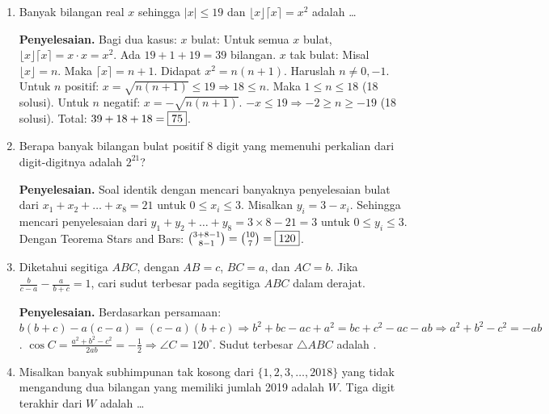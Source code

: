 \documentclass[12pt]{scrartcl}
\begin{document}
\begin{enumerate}
    \textbf{Penyelesaian.} Misalkan $A = \sum_{k=1}^{99} \sqrt{10+\sqrt{k}}$ dan $B = \sum_{k=1}^{99} \sqrt{10-\sqrt{k}}$. Tinjau $\frac{A}{B} = 1 + \frac{A-B}{B}$.
    $A-B = \sum_{k=1}^{99} \left(\sqrt{10+\sqrt{k}} - \sqrt{10-\sqrt{k}}\right) = \sum_{k=1}^{99} \sqrt{20-2\sqrt{100-k}} = \sqrt{2} \sum_{k=1}^{99} \sqrt{10-\sqrt{k}} = \sqrt{2}B$.
    Sehingga $\frac{A}{B} = 1+\sqrt{2}$. Jadi, soal $= \left(\frac{A}{B}\right)^2 + \left(\frac{B}{A}\right)^2 = (1+\sqrt{2})^2 + (\sqrt{2}-1)^2 = 3+2\sqrt{2}+3-2\sqrt{2} = \fbox{6}$.
    
    \item Banyak bilangan real $x$ sehingga $|x| \le 19$ dan $\lfloor x \rfloor \lceil x \rceil = x^2$ adalah \dots
    
    \textbf{Penyelesaian.} Bagi dua kasus:
    $x$ bulat: Untuk semua $x$ bulat, $\lfloor x \rfloor \lceil x \rceil = x \cdot x = x^2$. Ada $19+1+19=39$ bilangan.
    $x$ tak bulat: Misal $\lfloor x \rfloor = n$. Maka $\lceil x \rceil = n+1$. Didapat $x^2=n(n+1)$. Haruslah $n \ne 0, -1$.
    Untuk $n$ positif: $x = \sqrt{n(n+1)} \le 19 \Rightarrow 18 \le n$. Maka $1 \le n \le 18$ (18 solusi).
    Untuk $n$ negatif: $x = -\sqrt{n(n+1)}$. $-x \le 19 \Rightarrow -2 \ge n \ge -19$ (18 solusi).
    Total: $39+18+18 = \fbox{75}$.
    
    \item Berapa banyak bilangan bulat positif 8 digit yang memenuhi perkalian dari digit-digitnya adalah $2^{21}$?
    
    \textbf{Penyelesaian.} Soal identik dengan mencari banyaknya penyelesaian bulat dari $x_1+x_2+\dots+x_8=21$ untuk $0 \le x_i \le 3$. Misalkan $y_i=3-x_i$. Sehingga mencari penyelesaian dari $y_1+y_2+\dots+y_8 = 3 \times 8 - 21 = 3$ untuk $0 \le y_i \le 3$.
    Dengan Teorema Stars and Bars: $\binom{3+8-1}{8-1} = \binom{10}{7} = \fbox{120}$.
    
    \item Diketahui segitiga $ABC$, dengan $AB=c$, $BC=a$, dan $AC=b$. Jika $\frac{b}{c-a}-\frac{a}{b+c}=1$, cari sudut terbesar pada segitiga $ABC$ dalam derajat.
    
    \textbf{Penyelesaian.} Berdasarkan persamaan: $b(b+c)-a(c-a) = (c-a)(b+c) \Rightarrow b^2+bc-ac+a^2 = bc+c^2-ac-ab \Rightarrow a^2+b^2-c^2 = -ab$.
    $\cos C = \frac{a^2+b^2-c^2}{2ab} = -\frac{1}{2} \Rightarrow \angle C = 120^\circ$. Sudut terbesar $\triangle ABC$ adalah .
    
    \item Misalkan banyak subhimpunan tak kosong dari $\{1, 2, 3, \dots, 2018\}$ yang tidak mengandung dua bilangan yang memiliki jumlah 2019 adalah $W$. Tiga digit terakhir dari $W$ adalah \dots
    

\end{enumerate}
\end{document}
